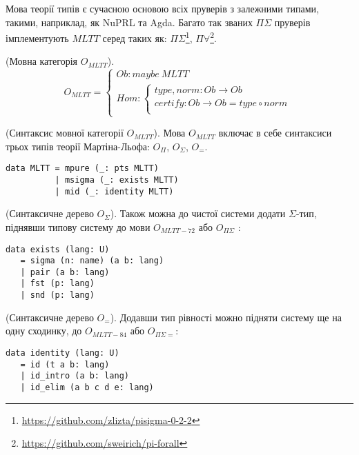 \begin{definition}
Мова теорії типів є сучасною основою всіх пруверів з залежними типами,
такими, наприклад, як NuPRL та Agda. Багато так званих $\Pi\Sigma$ пруверів
імплементують $MLTT$ серед таких як:
$\Pi\Sigma$\footnote{\url{https://github.com/zlizta/pisigma-0-2-2}},
$\Pi\forall$\footnote{\url{https://github.com/sweirich/pi-forall}}.

\begin{definition} (Мовна категорія $O_{MLTT}$).
$$
O_{MLTT} =
\begin{cases}
Ob: maybe\ MLTT \\
Hom: \begin{cases}
type,norm: Ob \rightarrow Ob \\
certify: Ob \rightarrow Ob = type \circ norm \\
\end{cases}
\end{cases}
$$
\end{definition}

\begin{definition} (Синтаксис мовної категорії $O_{MLTT}$).
Мова $O_{MLTT}$ включає в себе синтаксиси трьох типів
теорії Мартіна-Льофа: $O_\Pi$, $O_\Sigma$, $O_=$.
\begin{lstlisting}
data MLTT = mpure (_: pts MLTT)
          | msigma (_: exists MLTT)
          | mid (_: identity MLTT)
\end{lstlisting}
\end{definition}

\begin{definition} (Синтаксичне дерево $O_\Sigma$).
Також можна до чистої системи додати $\Sigma$-тип,
піднявши типову систему до мови $O_{MLTT-72}$ або $O_{\Pi\Sigma}$ :
\begin{lstlisting}[mathescape=true]
data exists (lang: U)
   = sigma (n: name) (a b: lang)
   | pair (a b: lang)
   | fst (p: lang)
   | snd (p: lang)
\end{lstlisting}
\end{definition}

\begin{definition} (Синтаксичне дерево $O_=$).
Додавши тип рівності можно підняти систему ще на одну сходинку,
до $O_{MLTT-84}$ або $O_{\Pi\Sigma=}$:
\begin{lstlisting}[mathescape=true]
data identity (lang: U)
   = id (t a b: lang)
   | id_intro (a b: lang)
   | id_elim (a b c d e: lang)
\end{lstlisting}
\end{definition}


\end{definition}
